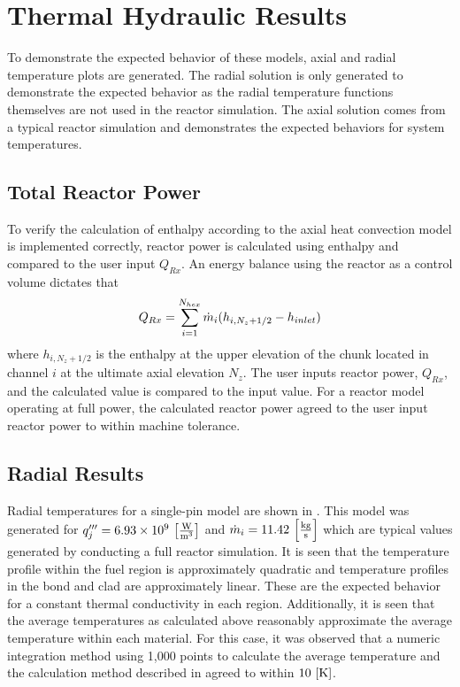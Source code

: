 \section{Thermal Hydraulic Results}
  To demonstrate the expected behavior of these models, axial and radial
  temperature plots are generated. The radial solution is only generated to
  demonstrate the expected behavior as the radial temperature functions
  themselves are not used in the reactor simulation. The axial solution comes
  from a typical reactor simulation and demonstrates the expected behaviors for
  system temperatures.
  
  \subsection{Total Reactor Power}
    To verify the calculation of enthalpy according to the axial heat convection
    model is implemented correctly, reactor power is calculated using enthalpy
    and compared to the user input $Q_{Rx}$. An energy balance using the reactor
    as a control volume dictates that
    \begin{equation}
      \label{eq:reactor_energy_balance}
      Q_{Rx} = \sum_{i=1}^{N_{hex}} \dot{m}_i (h_{i,N_z+1/2} - h_{inlet})
    \end{equation}
    where $h_{i,N_z+1/2}$ is the enthalpy at the upper elevation of the chunk
    located in channel $i$ at the ultimate axial elevation $N_z$. The user
    inputs reactor power, $Q_{Rx}$, and the calculated value is compared to the
    input value. For a reactor model operating at full power, the calculated
    reactor power agreed to the user input reactor power to within machine
    tolerance.

  \subsection{Radial Results}
    Radial temperatures for a single-pin model are shown in
    . This model was generated for 
    ${q'''_j = 6.93 \times 10^9 \,\left[\text{{$\frac{\text{W}}{\text{m}^3}$}}\right]}$ and 
    $\dot{m}_i = 11.42 \,\left[\text{{$\frac{\text{kg}}{\text{s}}$}}\right]$ which are typical 
    values generated by conducting a full reactor simulation. It is seen
    that the temperature profile within the fuel region is approximately 
    quadratic and temperature profiles in the bond and clad are approximately
    linear. These are the expected behavior for a constant thermal conductivity
    in each region. Additionally, it is seen that the average temperatures as
    calculated above reasonably approximate the average temperature within each
    material. For this case, it was observed that a numeric integration method
    using 1,000 points to calculate the average temperature and the calculation
    method described in  agreed to within 
    $10 \,\left[\text{{K}}\right]$.

